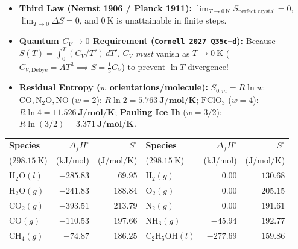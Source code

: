 \documentclass[10pt,twoside,openany,letterpaper]{book}
\begin{document}
\begin{quicksheet}
\begin{twocol}[0.51]
\begin{formulacard}
\begin{tabularx}{\linewidth}{@{}c c l X@{}}
\bottomrule
\end{tabularx}
\end{formulacard}
\nextcol[0.47]
\begin{formulacard}
\scriptsize
\begin{itemize}
  \item \textbf{Third Law (Nernst 1906 / Planck 1911):} $\lim_{T\to\SI{0}{\kelvin}} S_{\text{perfect crystal}} = 0$, $\lim_{T\to 0}\Delta S = 0$, and $\SI{0}{\kelvin}$ is unattainable in finite steps.
  \item \textbf{Quantum $C_V \to 0$ Requirement (\texttt{Cornell 2027 Q35c--d}):} Because $S(T) = \int_0^T (C_V/T')\,dT'$, $C_V$ \emph{must} vanish as $T\to\SI{0}{\kelvin}$ ($C_{V,\mathrm{Debye}} = AT^3 \implies S = \frac{1}{3}C_V$) to prevent $\ln T$ divergence!
  \item \textbf{Residual Entropy ($w$ orientations/molecule):} $\boxed{S_{0,m} = R\ln w}$:
  $\mathrm{CO, N_2O, NO}$ ($w=2$): $R\ln 2 = \mathbf{\SI{5.763}{\joule\per\mole\per\kelvin}}$; $\mathrm{FClO_3}$ ($w=4$): $R\ln 4 = \mathbf{\SI{11.526}{\joule\per\mole\per\kelvin}}$; \textbf{Pauling Ice Ih} ($w=3/2$): $R\ln(3/2) = \mathbf{\SI{3.371}{\joule\per\mole\per\kelvin}}$.
\end{itemize}
\par\smallskip\noindent
\scriptsize\setlength{\tabcolsep}{1.6pt}\renewcommand{\arraystretch}{1.06}
\begin{tabularx}{\linewidth}{@{}X r r | X r r@{}}
\toprule
\textbf{Species} & $\Delta_f H^\circ$ & $S^\circ$ & \textbf{Species} & $\Delta_f H^\circ$ & $S^\circ$ \\
($\SI{298.15}{\kelvin}$) & ($\si{\kilo\joule\per\mole}$) & ($\si{\joule\per\mole\per\kelvin}$) & ($\SI{298.15}{\kelvin}$) & ($\si{\kilo\joule\per\mole}$) & ($\si{\joule\per\mole\per\kelvin}$) \\
\midrule
$\mathrm{H_2O}(l)$ & $-285.83$ & $69.95$ & $\mathrm{H_2}(g)$ & $0.00$ & $130.68$ \\
$\mathrm{H_2O}(g)$ & $-241.83$ & $188.84$ & $\mathrm{O_2}(g)$ & $0.00$ & $205.15$ \\
$\mathrm{CO_2}(g)$ & $-393.51$ & $213.79$ & $\mathrm{N_2}(g)$ & $0.00$ & $191.61$ \\
$\mathrm{CO}(g)$ & $-110.53$ & $197.66$ & $\mathrm{NH_3}(g)$ & $-45.94$ & $192.77$ \\
$\mathrm{CH_4}(g)$ & $-74.87$ & $186.25$ & $\mathrm{C_2H_5OH}(l)$ & $-277.69$ & $159.86$ \\
\bottomrule
\end{tabularx}
\end{formulacard}
\end{twocol}
\end{quicksheet}
\end{document}
